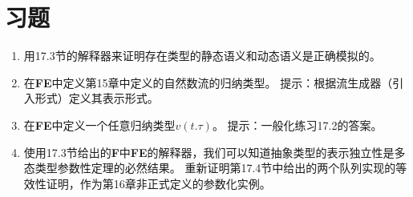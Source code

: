 \section*{习题}
\begin{enumerate}
\item 用17.3节的解释器来证明存在类型的静态语义和动态语义是正确模拟的。
\item 在\textbf{FE}中定义第15章中定义的自然数流的归纳类型。
提示：根据流生成器（引入形式）定义其表示形式。
\item 在\textbf{FE}中定义一个任意归纳类型$v(t.\tau)$。
提示：一般化练习17.2的答案。
\item 使用17.3节给出的\textbf{F}中\textbf{FE}的解释器，我们可以知道抽象类型的表示独立性是多态类型参数性定理的必然结果。
重新证明第17.4节中给出的两个队列实现的等效性证明，作为第16章非正式定义的参数化实例。
\end{enumerate}
